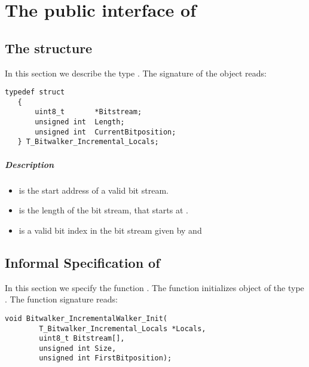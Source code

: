 

\chapter{The public interface of \bitwalker}

\section{The structure \bitwalkertype}


In this section we describe the type \bitwalkertype.
The signature of the object reads:

\begin{lstlisting}[style=acsl-block]
   typedef struct
   {
       uint8_t       *Bitstream;
       unsigned int  Length;
       unsigned int  CurrentBitposition;
   } T_Bitwalker_Incremental_Locals;
\end{lstlisting}


\paragraph{Description}

\begin{itemize}

   \item {} is  the start address of a valid bit stream.
   \item {} is the length of the bit stream, that starts at .
   \item {} is a valid bit index in
              the bit stream given by  and 

\end{itemize}


\clearpage

\section{Informal Specification of }

In this section we specify the function \init.
 The function  initializes object of the type \bitwalkertype.
The function signature reads:


\begin{lstlisting}[style=acsl-block]
void Bitwalker_IncrementalWalker_Init(
        T_Bitwalker_Incremental_Locals *Locals,
        uint8_t Bitstream[],
        unsigned int Size,
        unsigned int FirstBitposition);
\end{lstlisting}



